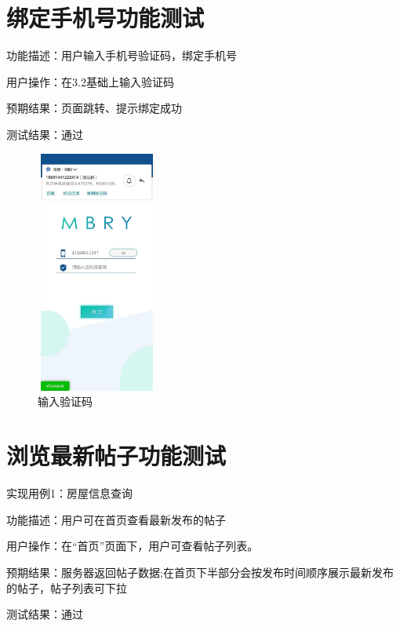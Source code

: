 \section{绑定手机号功能测试}
功能描述：用户输入手机号验证码，绑定手机号

用户操作：在3.2基础上输入验证码

预期结果：页面跳转、提示绑定成功

测试结果：通过

\begin{figure}[htbp]
    \centering
    \begin{minipage}[t]{0.48\textwidth}
    \centering
    \includegraphics[width=4cm,height=8cm]{test/image/test5.png} 
    \caption{输入验证码}
    \end{minipage}
\end{figure}
\newpage

\section{浏览最新帖子功能测试}
实现用例1：房屋信息查询

功能描述：用户可在首页查看最新发布的帖子

用户操作：在“首页”页面下，用户可查看帖子列表。

预期结果：服务器返回帖子数据;在首页下半部分会按发布时间顺序展示最新发布的帖子，帖子列表可下拉

测试结果：通过

